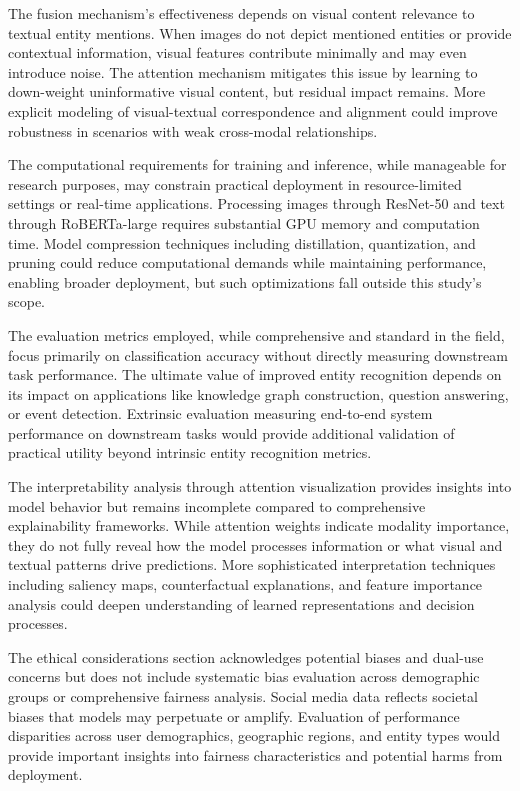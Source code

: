 \documentclass[12pt,a4paper]{report}
\begin{document}
The fusion mechanism's effectiveness depends on visual content relevance to textual entity mentions. When images do not depict mentioned entities or provide contextual information, visual features contribute minimally and may even introduce noise. The attention mechanism mitigates this issue by learning to down-weight uninformative visual content, but residual impact remains. More explicit modeling of visual-textual correspondence and alignment could improve robustness in scenarios with weak cross-modal relationships.

The computational requirements for training and inference, while manageable for research purposes, may constrain practical deployment in resource-limited settings or real-time applications. Processing images through ResNet-50 and text through RoBERTa-large requires substantial GPU memory and computation time. Model compression techniques including distillation, quantization, and pruning could reduce computational demands while maintaining performance, enabling broader deployment, but such optimizations fall outside this study's scope.

The evaluation metrics employed, while comprehensive and standard in the field, focus primarily on classification accuracy without directly measuring downstream task performance. The ultimate value of improved entity recognition depends on its impact on applications like knowledge graph construction, question answering, or event detection. Extrinsic evaluation measuring end-to-end system performance on downstream tasks would provide additional validation of practical utility beyond intrinsic entity recognition metrics.

The interpretability analysis through attention visualization provides insights into model behavior but remains incomplete compared to comprehensive explainability frameworks. While attention weights indicate modality importance, they do not fully reveal how the model processes information or what visual and textual patterns drive predictions. More sophisticated interpretation techniques including saliency maps, counterfactual explanations, and feature importance analysis could deepen understanding of learned representations and decision processes.

The ethical considerations section acknowledges potential biases and dual-use concerns but does not include systematic bias evaluation across demographic groups or comprehensive fairness analysis. Social media data reflects societal biases that models may perpetuate or amplify. Evaluation of performance disparities across user demographics, geographic regions, and entity types would provide important insights into fairness characteristics and potential harms from deployment.
\end{document}
